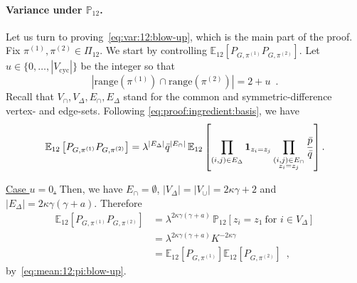 \documentclass[final]{colt2026}
\newcommand{\1}{\mathbf{1}}
\newcommand{\bbE}{\mathbb{E}}
\newcommand{\bbP}{\mathbb{P}}
\newcommand{\cro}[1]{\left[#1\right]}
\begin{document}
\paragraph{Variance under $\bbP_{12}$.}
Let us turn to proving~\eqref{eq:var:12:blow-up}, which is the main part of the proof. Fix $\pi^{(1)},\pi^{(2)}\in\Pi_{12}$. 
We start by controlling $\bbE_{12}\cro{P_{G,\pi^{(1)}}P_{G,\pi^{(2)}}}$. Let $u\in\{0,\dots,|V_{\mathrm{cyc}}|\}$ be the integer so that
\[
|\mathrm{range}(\pi^{(1)})\cap\mathrm{range}(\pi^{(2)})| = 2+u\enspace.
\]
Recall that  $V_{\cap},V_{\Delta},E_{\cap},E_{\Delta}$ stand for the common and symmetric-difference vertex- and edge-sets. 
Following \eqref{eq:proof:ingredient:basis}, we have 
\[
\bbE_{12}\cro{P_{G,\pi^{(1)}}P_{G,\pi^{(2)}}}
=\lambda^{|E_{\Delta}|} \bar q^{|E_{\cap}|} \,
\bbE_{12}\cro{\prod_{(i,j)\in E_{\Delta}}\mathbf 1_{z_{i}=z_{j}}
\prod_{\substack{(i,j)\in E_{\cap}\\ z_{i}=z_{j}}}{\bar p\over \bar q}}.
\]

\noindent\underline{Case $u=0$.} Then, we have $E_{\cap}=\emptyset$, $|V_{\Delta}|=|V_{\cup}|=2\kappa \gamma+2$ and $|E_{\Delta}|=2\kappa \gamma(\gamma+a)$. Therefore
\begin{align}\nonumber
\bbE_{12}\cro{P_{G,\pi^{(1)}}P_{G,\pi^{(2)}}}
&= \lambda^{2\kappa \gamma(\gamma+a)} \,\bbP_{12}\cro{z_i=z_1\ \text{for }i\in V_{\Delta}} \\
& =  \lambda^{2\kappa \gamma(\gamma+a)} K^{-2\kappa\gamma}  \nonumber \\ 
& = \bbE_{12}\cro{P_{G,\pi^{(1)}}}\bbE_{12}\cro{P_{G,\pi^{(2)}}}\enspace , \label{eq:upper_cross_u:0:blow-up}
\end{align}
by~\eqref{eq:mean:12:pi:blow-up}. 
\end{document}
